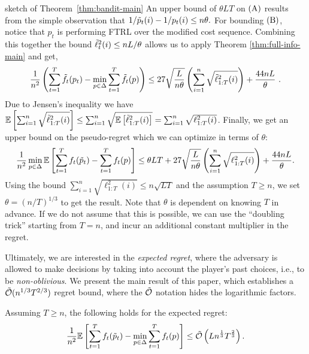 \begin{proofarg}{sketch of Theorem~\ref{thm:bandit-main}}
An upper bound of $  \theta  L  T$ on $\rA$ results from the  simple observation that 
$
1/\tilde{p}_t(i)- 1/p_t(i) \leq n \theta.
$
For bounding $\rB$, notice that  $p_t$ is   performing FTRL over the modified cost sequence. Combining this together the  bound $\tilde{\ell}_t^2(i) \leq nL/\theta$ allows us to apply Theorem \ref{thm:full-info-main} and get,
\begin{equation}\label{eq:RegretModifiedCosts}
\frac{1}{n^2}\left( \sum_{t=1}^T \tilde{f}_t(p_t)  - \min_{p \in \Delta } \sum_{t=1}^T \tilde{f}_t(p) \right)
 \leq 
  27 \sqrt{\frac{L}{n \theta}}\left(\sum_{i=1}^n \sqrt{ \tilde{\ell}_{1:T}^2(i) }  \right) +\frac{44nL}{\theta} ~.
\end{equation}
Due to Jensen's inequality we have 
$
\mathbb{E}\left[ \sum_{i=1}^n  \sqrt{\tilde{\ell}_{1:T}^2(i)} \right] 
 \leq \sum_{i=1}^n \sqrt{\mathbb{E}\left[ \tilde{\ell}_{1:T}^2(i) \right]} = \sum_{i=1}^n \sqrt{\ell_{1:T}^2(i)} 
$.
Finally, we get an upper bound on the pseudo-regret which we can optimize in terms of $\theta$:
\begin{equation*}
\frac{1}{n^2}  \min_{p \in \Delta }  \mathbb{E}\left[    \sum_{t=1}^T f_t(\tilde{p}_t)  -  \sum_{t=1}^T f_t(p) \right] \leq \theta LT +27\sqrt{\frac{L}{n \theta}}\left(\sum_{i=1}^n \sqrt{ \ell_{1:T}^2(i) }  \right) +\frac{44nL}{\theta} .
\end{equation*}
Using the bound $\sum_{i=1}^n \sqrt{ \ell_{1:T}^2(i) }\leq n \sqrt{LT}$ and the assumption $T\geq n$, we set $\theta = (n/T)^{1/3}$ to get the result. Note that  $\theta$ is dependent on knowing $T$ in advance. If we do not assume that this is possible, we can use the ``doubling trick'' starting from $T=n$, and incur an additional constant multiplier in the regret.
\end{proofarg}

Ultimately, we are interested in the \emph{expected regret}, where the adversary is allowed to make decisions by taking into account the player's past choices, i.e., to be \emph{non-oblivious}. 
We present the main result of this paper, which establishes a $\tilde{\mathcal{O}}(n^{1/3}T^{2/3})$  regret bound, where the $\tilde{\mathcal{O}}$ notation hides the logarithmic factors.

\begin{theorem} \label{thm:bandit-non-oblivious}
Assuming $T \geq n$, the following holds for the expected regret:
\begin{equation*}
\frac{1}{n^2} \mathbb{E}\left[    \sum_{t=1}^T f_t(\tilde{p}_t)  - \min_{p \in \Delta }  \sum_{t=1}^T f_t(p) \right] \leq \tilde{\mathcal{O}}\left(Ln^{\frac{1}{3}}T^{\frac{2}{3}}\right).
\end{equation*}
\end{theorem}

